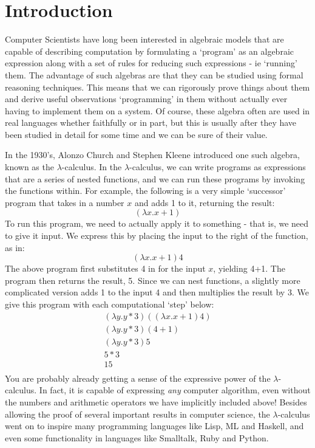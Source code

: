 \chapter{Introduction}
	Computer Scientists have long been interested in algebraic models that are capable of describing computation by formulating a `program' as an algebraic expression along with a set of rules for reducing such expressions - ie `running' them.  The advantage of such algebras are that they can be studied using formal reasoning techniques.  This means that we can rigorously prove things about them and derive useful observations `programming' in them without actually ever having to implement them on a system.  Of course, these algebra often are used in real languages whether faithfully or in part, but this is usually after they have been studied in detail for some time and we can be sure of their value.
	
	In the 1930's, Alonzo Church and Stephen Kleene introduced one such algebra, known as the $\lambda$-calculus.  In the $\lambda$-calculus, we can write programs as expressions that are a series of nested functions, and we can run these programs by invoking the functions within.  For example, the following is a very simple `successor' program that takes in a number $x$ and adds 1 to it, returning the result:
	\[
		(\lambda x. x + 1)
	\]
To run this program, we need to actually apply it to something - that is, we need to give it input.  We express this by placing the input to the right of the function, as in:
\[
	(\lambda x. x + 1) 4
\]
The above program first substitutes 4 in for the input $x$, yielding 4+1.  The program then returns the result, 5.  Since we can nest functions, a slightly more complicated version adds 1 to the input 4 and then multiplies the result by 3.  We give this program with each computational `step' below:
\begin{align*}
	(\lambda y. y * 3) ((\lambda x. x + 1) 4)\\
	(\lambda y. y * 3) (4+1)\\
	(\lambda y. y * 3) 5\\
	5 * 3\\
	15\\
\end{align*}
You are probably already getting a sense of the expressive power of the $\lambda$-calculus.  In fact, it is capable of expressing \emph{any} computer algorithm, even without the numbers and arithmetic operators we have implicitly included above!  Besides allowing the proof of several important results in computer science, the $\lambda$-calculus went on to inspire many programming languages like Lisp, ML and Haskell, and even some functionality in languages like Smalltalk, Ruby and Python.

